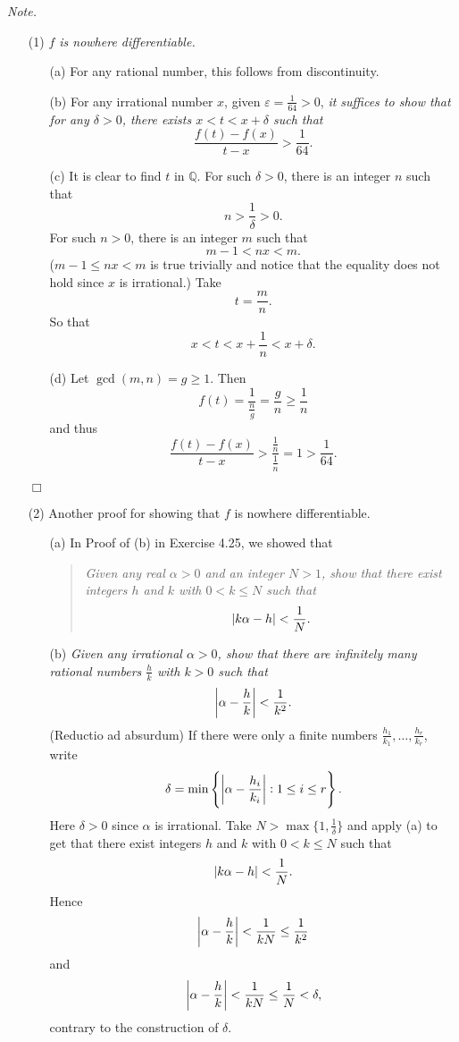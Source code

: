 \documentclass{article}
\begin{document}
\emph{Note.}
\begin{enumerate}
\item[(1)]
\emph{$f$ is nowhere differentiable.}
  \begin{enumerate}
  \item[(a)]
  For any rational number, this follows from discontinuity.

  \item[(b)]
  For any irrational number $x$, given $\varepsilon = \frac{1}{64} > 0$,
  \emph{it suffices to show that for any $\delta > 0$, there exists $x < t < x + \delta$ such that
  \[
    \frac{f(t)-f(x)}{t-x} > \frac{1}{64}.
  \]}

  \item[(c)]
  It is clear to find $t$ in $\mathbb{Q}$.
  For such $\delta > 0$, there is an integer $n$ such that
  \[
    n > \frac{1}{\delta} > 0.
  \]
  For such $n > 0$, there is an integer $m$ such that
  \[
    m-1 < nx < m.
  \]
  ($m-1 \leq nx < m$ is true trivially and notice that the equality does not hold
  since $x$ is irrational.)
  Take
  \[
    t = \frac{m}{n}.
  \]
  So that
  \[
    x < t < x + \frac{1}{n} < x + \delta.
  \]

  \item[(d)]
  Let $\gcd(m,n) = g \geq 1$.
  Then
  \[
    f(t) = \frac{1}{\frac{n}{g}} = \frac{g}{n} \geq \frac{1}{n}
  \]
  and thus
  \[
    \frac{f(t)-f(x)}{t-x} > \frac{\frac{1}{n}}{\frac{1}{n}} = 1 > \frac{1}{64}.
  \]
  \end{enumerate}
  $\Box$

\item[(2)]
  Another proof for showing that $f$ is nowhere differentiable.
  \begin{enumerate}
  \item[(a)]
  In Proof of (b) in Exercise 4.25, we showed that
  \begin{quote}
    \emph{Given any real $\alpha > 0$ and an integer $N > 1$,
    show that there exist integers $h$ and $k$ with $0 < k \leq N$ such that
    \[
      \abs{ k\alpha - h } < \frac{1}{N}.
    \]}
  \end{quote}

  \item[(b)]
  \emph{Given any irrational $\alpha > 0$,
  show that there are infinitely many rational numbers
  $\frac{h}{k}$ with $k > 0$ such that
  \[
    \abs{ \alpha - \frac{h}{k} } < \frac{1}{k^2}.
  \]}
  (Reductio ad absurdum)
  If there were only a finite numbers
  $\frac{h_1}{k_1}, \ldots, \frac{h_r}{k_r}$,
  write
  \[
    \delta = \min\left\{ \abs{ \alpha - \frac{h_i}{k_i} } : 1 \leq i \leq r \right\}.
  \]
  Here $\delta > 0$ since $\alpha$ is irrational.
  Take $N > \max\{1, \frac{1}{\delta} \}$ and apply (a) to get that
  there exist integers $h$ and $k$ with $0 < k \leq N$ such that
  \[
    \abs{ k\alpha - h } < \frac{1}{N}.
  \]
  Hence
  \[
    \abs{ \alpha - \frac{h}{k} } < \frac{1}{kN} \leq \frac{1}{k^2}
  \]
  and
  \[
    \abs{ \alpha - \frac{h}{k} } < \frac{1}{kN} \leq \frac{1}{N} < \delta,
  \]
  contrary to the construction of $\delta$.


\end{enumerate}
\end{enumerate}
\end{document}
